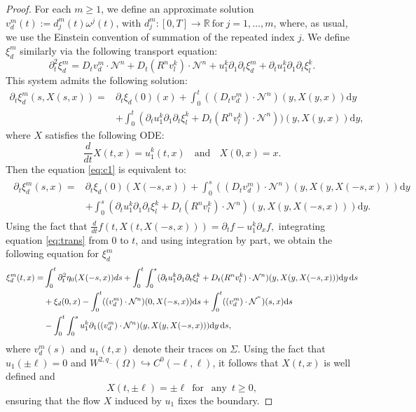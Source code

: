 \documentclass[letterpaper,reqno,10pt,twoside]{amsart}
\theoremstyle{definition}
\theoremstyle{remark}
\def\p{\partial}
\def\no{\nonumber}
\begin{document}
\begin{proof}
		For each $m\ge1$, we define an approximate solution $
		v_{d}^m(t):=d^m_j(t)\omega^j(t)$, with $d^m_j: [0, T]\rightarrow\mathbb{R}\ \text{for}\ j=1, \dots, m$,
		where, as usual, we use the Einstein convention of summation of the repeated index $j$. We define $\xi_{d}^{m}$ similarly via the following transport equation:
		\[
		\partial_{t}^{2}\xi_{d}^{m}=D_{t}v_{d}^{m}\cdot \mathcal{N}^{n}
		+D_{t}(R^{n}v_{l}^{k})\cdot \mathcal{N}^{n}+u_{1}^{k}\partial_{1}\partial_{t}\xi_{d}^{m}+\p_{t}u_{1}^{k}\partial_{1}\partial_{t}\xi_{l}^{k}.
		\]
		\noindent This system admits the following solution:
		\begin{align}
			\partial_{t}\xi_{d}^{m}(s,X(s,x))=&\partial_{t}\xi_{d}(0)(x)+\int_{0}^{t}((D_{t}v_{d}^{m})\cdot \mathcal{N}^{n}) (y,X(y,x))\mathrm{d}y\no\\
			&+\int_{0}^{t}(\partial_{t}u_{1}^{k}\partial_{1}\partial_{t}\xi_{l}^{k}+D_{t}(R^{n}v_{l}^{k})\cdot \mathcal{N}^{n}))(y,X(y,x))\mathrm{d}y \label{eq:c1},
		\end{align}
		\noindent where $X$ satisfies the following ODE:
		\[
		\frac{d}{dt}X(t,x)=u_{1}^{k}(t,x)~~~\operatorname{and}~~~X(0,x)=x.
		\]
		\noindent Then the equation \eqref{eq:c1} is equivalent to:
		\begin{align}\label{eq:trans}
			\begin{aligned}
				\partial_{t}\xi_{d}^{m}(s,x)=&\partial_{t}\xi_{d}(0)(X(-s,x))+\int_{0}^{s}((D_{t}v_{d}^{m})\cdot \mathcal{N}^{n}) (y,X(y,X(-s,x)))\mathrm{d}y\\
				&+\int_{0}^{s}(\partial_{t}u_{1}^{k}\partial_{1}\partial_{t}\xi_{l}^{k}+D_{t}(R^{n}v_{l}^{k})\cdot \mathcal{N}^{n})(y,X(y,X(-s,x)))\mathrm{d}y.
			\end{aligned}
		\end{align}
		\noindent Using the fact that
		$
		\frac{d}{dt}f(t,X(t,X(-s,x)))=\partial_{t}f-u_{1}^{k}\partial_{x}f,
		$
		\noindent integrating equation \eqref{eq:trans} from $0$ to $t$, and using integration by part, we obtain the following equation for $\xi_{d}^{m}$
		\begin{align}{\label{eq:xi_d}}
			\xi_{d}^{m}(t,x)=&\int_{0}^{t}\partial_{t}^{2}\eta_{0}(X(-s,x))ds+\int_{0}^{t}\int_{0}^{s}(\partial_{t}u_{1}^{k}\partial_{1}\partial_{t}\xi_{l}^{k}+D_{t}(R^{n}v_{l}^{k})\cdot \mathcal{N}^{n})(y,X(y,X(-s,x)))\mathrm{d}y\,\mathrm{d}s\notag\\
			&+\xi_{d}(0,x)-\int_{0}^{t}((v_{d}^{m})\cdot \mathcal{N}^{n})(0,X(-s,x))\mathrm{d}s+\int_{0}^{t} ((v_{d}^{m})\cdot \mathcal{N}^{^{n}})(s,x)\mathrm{d}s
			\\
			&-\int_{0}^{t}\int_{0}^{s}u_{1}^{k}\partial_{1}((v_{d}^{m})\cdot \mathcal{N}^{n})(y,X(y,X(-s,x)))\mathrm{d}y\,\mathrm{d}s\no,
		\end{align}
		where $v_{d}^m(s)$ and $u_{1}(t,x)$ denote their traces on $\Sigma$. Using the fact that $u_{1}(\pm \ell)=0$ and $W^{2,q_{-}}(\Omega)\hookrightarrow C^{0}(-\ell,\ell)$, it follows that $X(t,x)$ is well defined and
		\[
		X(t,\pm \ell)=\pm \ell~\operatorname{for}~\operatorname{any}~t\geq 0,
		\]
		\noindent ensuring that the flow $X$ induced by $u_{1}$ fixes the boundary.
		

\end{proof}
\end{document}
